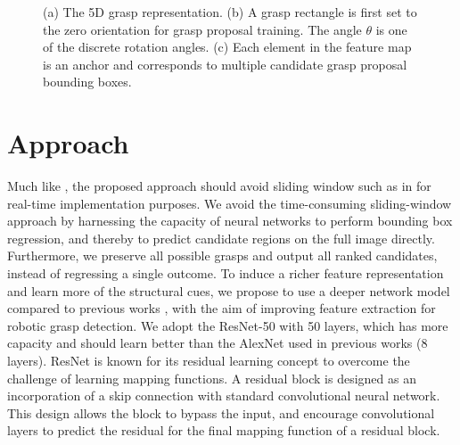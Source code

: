 \documentclass[letterpaper, 10 pt, journal, twoside]{IEEEtran}
\begin{document}
\begin{figure}
  \vspace*{0.07in}
  \hspace*{-0.02in}
  \centering
  \vspace*{-1.0ex}
  \caption{
    (a) The 5D grasp representation. 
(b) A grasp rectangle is first set to the zero orientation for grasp 
    proposal training. The angle $\theta$ is one of the discrete rotation
    angles. 
    (c) Each element in the feature map is an anchor and corresponds
    to multiple candidate grasp proposal bounding boxes.
    \label{fig_rectangle}}
  \vspace*{-1.0ex}
\end{figure}

 
\section{Approach}



Much like \cite{redmon2015real,GuEtAl_ICRA2017}, the proposed approach
should avoid sliding window such as in \cite{lenz2015deep} for real-time
implementation purposes. We avoid the time-consuming sliding-window
approach by harnessing the capacity of neural networks to perform
bounding box regression, and thereby to predict candidate regions on the
full image directly.  Furthermore, we preserve all possible grasps and
output all ranked candidates, instead of regressing a single outcome.
To induce a richer feature representation and learn more of the
structural cues, we propose to use a deeper network model compared to
previous works \cite{redmon2015real, lenz2015deep, pinto2016supersizing},
with the aim of improving feature extraction for robotic grasp detection. 
We adopt the ResNet-50 \cite{he2016deep} with 50 layers, which has more
capacity and should learn better than the AlexNet
\cite{krizhevsky2012imagenet} used in previous works (8 layers). 
ResNet is known for its residual learning concept to overcome the challenge
of learning mapping functions. A residual block is designed as an incorporation
of a skip connection with standard convolutional neural network. This design
allows the block to bypass the input, and encourage convolutional layers to
predict the residual for the final mapping function of a residual block. 
\end{document}
